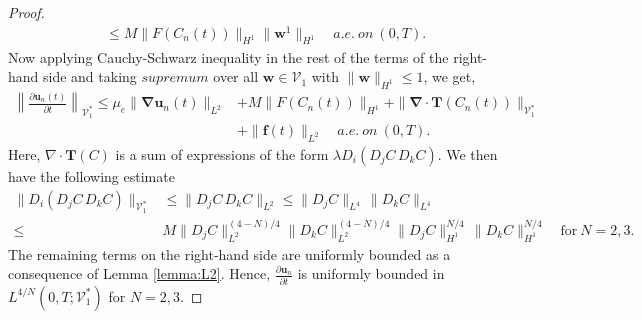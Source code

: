 \documentclass[10pt,a4paper]{amsart}
\newcommand{\lV}{\lVert}
\newcommand{\rV}{\rVert}
\begin{document}
\begin{proof}
\begin{align}
     &\leq M \lVert {F \left( C_n \left( t \right) \right)} \rVert_{H^1} \lVert \mathbf w^1 \rVert_{H^1} \quad a.e. \ on \ \left( 0, T \right). \label{eq: estimate of F(C_n)} 
\end{align}
Now applying Cauchy-Schwarz inequality in the rest of the terms of the right-hand side and taking $supremum$ over all $\mathbf w \in \mathscr V_1$ with $\|\mathbf w\|_{H^1} \le1$, we get,
\begin{align}
     \left \lVert \frac{\partial \mathbf{u}_n\left(t\right)}{\partial t} \right\rVert_{\mathscr V_1^*} \le \mu_e\|\boldsymbol{\nabla} \mathbf{u}_n\left(t\right)\|_{L^2} 
     & + M\|{ F\left(C_n\left(t\right)\right)}\|_{H^1} + \| \boldsymbol{\nabla} \cdot \mathbf{T}\left(C_n\left(t\right)\right) \|_{\mathscr V_1^*} \nonumber \\
     & + \| \mathbf f\left(t\right)\|_{L^2}  \quad  a.e. \ on \ \left(0,T\right)\label{eq: L51}. 
\end{align}
Here, $\nabla \cdot \mathbf{T}(C)$ is a sum of expressions of the form $\lambda D_i(D_j C \, D_k C)$. We then have the following estimate
\begin{align}\label{est: korteweg stress}
\| D_i(D_j C \, D_k C) \|_{\mathscr  V_1^*} & \leq \| D_j C \, D_k C \|_{L^2} \leq \| D_j C \|_{L^4} \, \| D_k C \|_{L^4}  \nonumber\\
\leq & M  \lV D_j C\rV^{(4-N)/4}_{L^2}  \lV D_k C\rV^{(4-N)/4}_{L^2} \| D_j C \|_{H^1}^{N/4} \, \| D_k C \|_{H^1}^{N/4} \quad\text{for}\ N = 2,3 .
\end{align}
The remaining terms on the right-hand side are uniformly bounded as a consequence of Lemma \ref{lemma:L2}.  Hence, $ \displaystyle \frac{\partial \mathbf u_n}{\partial t}$ is uniformly bounded in $L^{4/N}\left(0,T;\mathscr V_1^*\right)$ for $N=2,3$.
\end{proof}
\end{document}

